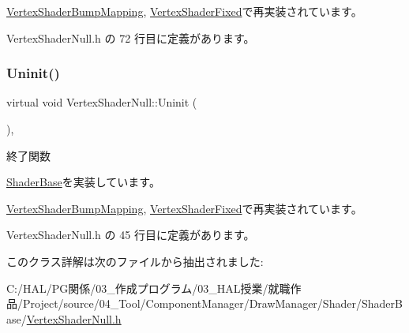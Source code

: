 \mbox{\hyperlink{class_vertex_shader_bump_mapping_ad81d57336763441c4071f967b57dbce1}{Vertex\+Shader\+Bump\+Mapping}}, \mbox{\hyperlink{class_vertex_shader_fixed_a87523c320f6f6767d59d7b24265db7ec}{Vertex\+Shader\+Fixed}}で再実装されています。



 Vertex\+Shader\+Null.\+h の 72 行目に定義があります。

\mbox{\label{class_vertex_shader_null_a16334df4ac02db3dd63f042622032301}} 
\subsubsection{\texorpdfstring{Uninit()}{Uninit()}}
{\footnotesize\ttfamily virtual void Vertex\+Shader\+Null\+::\+Uninit (\begin{DoxyParamCaption}{ }\end{DoxyParamCaption})\hspace{0.3cm}{\ttfamily [inline]}, {\ttfamily [virtual]}}



終了関数 



\mbox{\hyperlink{class_shader_base_a784edfa81bec4d08a257ed4f02c61222}{Shader\+Base}}を実装しています。



\mbox{\hyperlink{class_vertex_shader_bump_mapping_abed4e0aa9655fa7a7a21e03d00e7c0e5}{Vertex\+Shader\+Bump\+Mapping}}, \mbox{\hyperlink{class_vertex_shader_fixed_a49f630aee4757c8fd8bae886f22dfeb0}{Vertex\+Shader\+Fixed}}で再実装されています。



 Vertex\+Shader\+Null.\+h の 45 行目に定義があります。



このクラス詳解は次のファイルから抽出されました\+:\begin{DoxyCompactItemize}
\item 
C\+:/\+H\+A\+L/\+P\+G関係/03\+\_\+作成プログラム/03\+\_\+\+H\+A\+L授業/就職作品/\+Project/source/04\+\_\+\+Tool/\+Component\+Manager/\+Draw\+Manager/\+Shader/\+Shader\+Base/\mbox{\hyperlink{_vertex_shader_null_8h}{Vertex\+Shader\+Null.\+h}}\end{DoxyCompactItemize}
